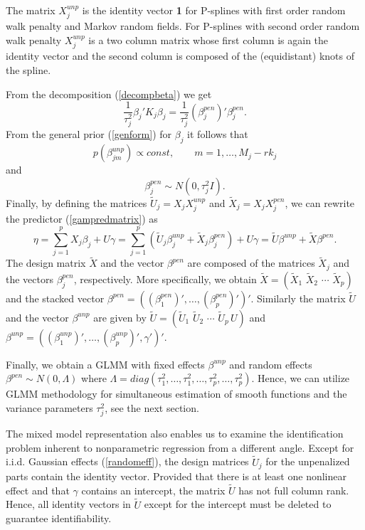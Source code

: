 The matrix $X_j^{unp}$ is the identity vector {\bf 1} for
P-splines with first order random walk penalty and Markov random
fields. For P-splines with second order random walk penalty
$X_j^{unp}$ is a two column matrix whose first column is again the
identity vector and the second column is composed of the
(equidistant) knots of the spline.

From the decomposition (\ref{decompbeta}) we get
$$
\frac{1}{\tau^2_j} \beta_j' K_j \beta_j = \frac{1}{\tau^2_j}
(\beta_j^{pen})' \beta_j^{pen}.
$$
From the general prior (\ref{genform}) for $\beta_j$ it follows
that
$$
p(\beta_{jm}^{unp}) \propto const , \qquad m=1,\dots, M_j-rk_j
$$
and
\begin{equation}
\label{priorunp} \beta_j^{pen} \sim N(0,\tau_j^2 I).
\end{equation}
Finally, by defining the matrices $\tilde{U}_j = X_j X_j^{unp}$
and $\tilde{X}_j = X_j X_j^{pen}$, we can rewrite the predictor
(\ref{gampredmatrix}) as
$$
\eta = \sum_{j=1}^{p} X_j \beta_j  + U \gamma
     = \displaystyle \sum_{j=1}^{p}  (\tilde{U}_j \beta_j^{unp} + \tilde{X}_j
     \beta_j^{pen}) +  U \gamma
= \displaystyle \tilde{U} \beta^{unp} + \tilde{X} \beta^{pen}.
$$
The design matrix $\tilde{X}$ and the vector $\beta^{pen}$ are
composed of the matrices $\tilde{X}_j$ and the vectors
$\beta_j^{pen}$, respectively. More specifically, we obtain
$\tilde{X} = (\tilde{X}_1 \,\, \tilde{X}_2 \,\, \cdots \,\,
\tilde{X}_p) $ and the stacked vector $\beta^{pen} =
((\beta_1^{pen})',\dots,(\beta_p^{pen})')'$. Similarly the matrix
$\tilde{U}$ and the vector $\beta^{unp}$ are given by $\tilde{U} =
(\tilde{U}_1 \,\, \tilde{U}_2 \,\, \cdots \,\, \tilde{U}_p \, U)$
and $\beta^{unp} =
((\beta_1^{unp})',\dots,(\beta_p^{unp})',\gamma')'$.

Finally, we obtain a GLMM with fixed effects $\beta^{unp}$ and
random effects $\beta^{pen} \sim N(0,\Lambda)$ where $\Lambda =
diag(\tau^2_1,\dots,\tau^2_1,\dots,\tau^2_p,\dots,\tau^2_p)$.
Hence, we can utilize GLMM methodology for simultaneous estimation
of smooth functions and the variance parameters $\tau^2_j$, see
the next section.

The mixed model representation also enables us to examine the
identification problem inherent to nonparametric regression from a
different angle. Except for i.i.d. Gaussian effects
(\ref{randomeff}), the design matrices $\tilde{U}_j$ for the
unpenalized parts contain the identity vector.  Provided that
there is at least one nonlinear effect and that $\gamma$ contains
an intercept, the matrix $\tilde{U}$ has not full column rank.
Hence, all identity vectors in $\tilde{U}$ except for the
intercept must be deleted to guarantee identifiability.



